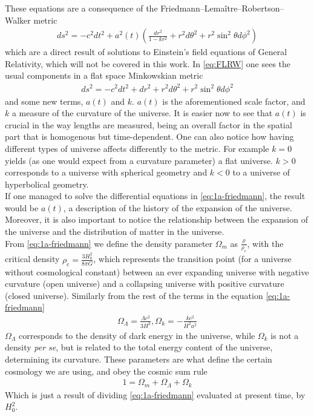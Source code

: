 These equations are a consequence of the Friedmann–Lemaître–Robertson–Walker metric \cite{cosmology}
\begin{align}
	ds ^2 = -c^2 dt^2  + a^2(t) \left( \frac{dr^2}{1-kr^2} +r^2d\theta ^2 + r^2 \sin^2\theta d\phi^2\right) 
	\label{eq:FLRW}
\end{align}which are a direct result of solutions to Einstein's field equations of General Relativity, which will not be covered in this work. In \eqref{eq:FLRW} one sees the usual components in a flat space Minkowskian metric 
\begin{align}
	ds^2 = -c^2dt^2 + dr^2 + r^2d\theta^2 + r^2 \sin^2\theta d\phi^2
\end{align} and some new terms, $a(t)$ and $k$. $a(t)$ is the aforementioned scale factor, and $k$ a measure of the curvature of the universe. It is easier now to see that $a(t)$ is crucial in the way lengths are measured, being an overall factor in the spatial part that is homogenous but time-dependent. One can also notice how having different types of universe affects differently to the metric. For example $k=0$ yields (as one would expect from a curvature parameter) a flat universe. $k>0$ corresponds to a universe with spherical geometry and $k<0$ to a universe of hyperbolical geometry. \\

If one managed to solve the differential equations in \eqref{eq:1a-friedmann}, the result would be $a(t)$, a description of the history of the expansion of the universe. Moreover, it is also important to notice the relationship between the expansion of the universe and the distribution of matter in the universe. \\

From \eqref{eq:1a-friedmann} we define the density parameter $\Omega_m$ as $\frac{\rho}{\rho_{\text{c}}}$, with the critical density $\rho_{\text{c}} = \frac{3H_0^2}{8\pi G}$, which represents the transition point (for a universe without cosmological constant) between an ever expanding universe with negative curvature (open universe) and a collapsing universe with positive curvature (closed universe). Similarly from the rest of the terms in the equation \eqref{eq:1a-friedmann}
\begin{align}
 \Omega_\Lambda = \frac{\Lambda c^2}{3H^2}, \Omega_k = -\frac{kc^2}{H^2a^2} 
 \label{eq:definitions}
\end{align}
$\Omega_\Lambda$ corresponds to the density of dark energy in the universe, while $\Omega_k$ is not a density \textit{per se}, but is related to the total energy content of the universe, determining its curvature.
These parameters are what define the certain cosmology we are using, and obey the cosmic sum rule 
\begin{align}
	1 = \Omega_m + \Omega_\Lambda + \Omega_k
	\label{eq:cosmic-sum-rule}
\end{align}
Which is just a result of dividing \eqref{eq:1a-friedmann} evaluated at present time, by  $H_0^2$. \\

